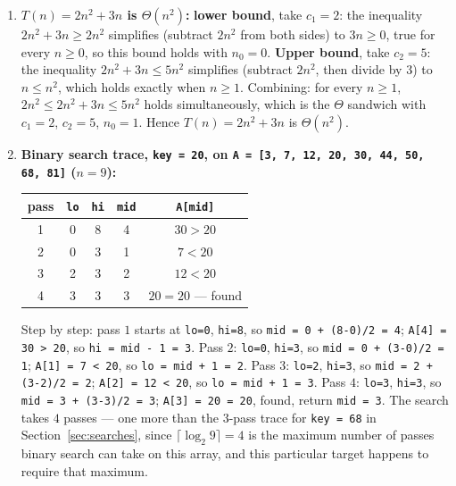 \documentclass[11pt]{article}
\begin{document}
\begin{enumerate}
    The inequality $5n + 10 \leq 6n$ simplifies (subtract $5n$ from both
    sides) to $10 \leq n$, which is exactly the condition $n \geq n_0 = 10$.
    Checking the boundary at $n = 10$: $5(10) + 10 = 60$, and $6(10) = 60$,
    so $60 \leq 60$ holds with equality. For any $n > 10$ the gap
    $6n - (5n+10) = n - 10 > 0$ only grows, so the inequality continues to
    hold. Hence $T(n) = 5n + 10$ is $O(n)$ with $c = 6$, $n_0 = 10$. (Other
    valid choices exist too --- e.g.\ $c = 15$, $n_0 = 1$ also works, since
    $O$ only requires \emph{some} valid $c$ and $n_0$ to exist, not a unique
    pair.)
  \item \textbf{$T(n) = 2n^2 + 3n$ is $\Theta(n^2)$:} \textbf{lower bound},
    take $c_1 = 2$: the inequality $2n^2 + 3n \geq 2n^2$ simplifies (subtract
    $2n^2$ from both sides) to $3n \geq 0$, true for every $n \geq 0$, so
    this bound holds with $n_0 = 0$. \textbf{Upper bound}, take $c_2 = 5$:
    the inequality $2n^2 + 3n \leq 5n^2$ simplifies (subtract $2n^2$, then
    divide by $3$) to $n \leq n^2$, which holds exactly when $n \geq 1$.
    Combining: for every $n \geq 1$, $2n^2 \leq 2n^2 + 3n \leq 5n^2$ holds
    simultaneously, which is the $\Theta$ sandwich with $c_1 = 2$,
    $c_2 = 5$, $n_0 = 1$. Hence $T(n) = 2n^2 + 3n$ is $\Theta(n^2)$.
  \item \textbf{Binary search trace, \texttt{key = 20}, on
    \texttt{A = [3, 7, 12, 20, 30, 44, 50, 68, 81]} ($n = 9$):}
    \begin{center}
    \begin{tabular}{ccccc}
    \toprule
    \textbf{pass} & \texttt{lo} & \texttt{hi} & \texttt{mid} & \texttt{A[mid]} \\
    \midrule
    1 & 0 & 8 & 4 & $30 > 20$ \\
    2 & 0 & 3 & 1 & $7 < 20$ \\
    3 & 2 & 3 & 2 & $12 < 20$ \\
    4 & 3 & 3 & 3 & $20 = 20$ --- found \\
    \bottomrule
    \end{tabular}
    \end{center}
    Step by step: pass $1$ starts at \texttt{lo=0}, \texttt{hi=8}, so
    \texttt{mid = 0 + (8-0)/2 = 4}; \texttt{A[4] = 30 > 20}, so
    \texttt{hi = mid - 1 = 3}. Pass $2$: \texttt{lo=0}, \texttt{hi=3}, so
    \texttt{mid = 0 + (3-0)/2 = 1}; \texttt{A[1] = 7 < 20}, so
    \texttt{lo = mid + 1 = 2}. Pass $3$: \texttt{lo=2}, \texttt{hi=3}, so
    \texttt{mid = 2 + (3-2)/2 = 2}; \texttt{A[2] = 12 < 20}, so
    \texttt{lo = mid + 1 = 3}. Pass $4$: \texttt{lo=3}, \texttt{hi=3}, so
    \texttt{mid = 3 + (3-3)/2 = 3}; \texttt{A[3] = 20 = 20}, found, return
    \texttt{mid = 3}. The search takes $4$ passes --- one more than the
    $3$-pass trace for \texttt{key = 68} in Section~\ref{sec:searches},
    since $\lceil \log_2 9 \rceil = 4$ is the maximum number of passes
    binary search can take on this array, and this particular target
    happens to require that maximum.
\end{enumerate}
\endgroup
\end{document}
